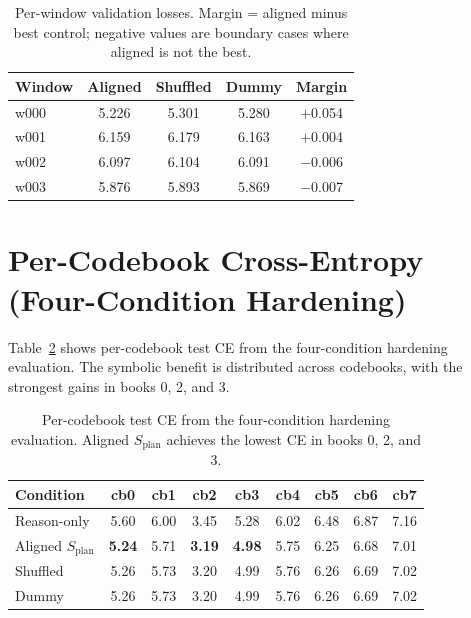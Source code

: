 \documentclass[11pt]{article}
\newcommand{\splan}{$S_{\mathrm{plan}}$}
\begin{document}
\begin{table}[h]
\centering
\small
\begin{tabular}{lcccc}
\toprule
Window & Aligned & Shuffled & Dummy & Margin \\
\midrule
w000 & 5.226 & 5.301 & 5.280 & $+$0.054 \\
w001 & 6.159 & 6.179 & 6.163 & $+$0.004 \\
w002 & 6.097 & 6.104 & 6.091 & $-$0.006 \\
w003 & 5.876 & 5.893 & 5.869 & $-$0.007 \\
\bottomrule
\end{tabular}
\caption{Per-window validation losses.  Margin = aligned minus best control;
  negative values are boundary cases where aligned is not the best.}
\label{tab:warmup_cases}
\end{table}

\section{Per-Codebook Cross-Entropy (Four-Condition Hardening)}
\label{app:codebook}

Table~\ref{tab:codebook} shows per-codebook test CE from the four-condition hardening
evaluation.  The symbolic benefit is distributed across codebooks, with the strongest
gains in books 0, 2, and 3.

\begin{table}[h]
\centering
\small
\setlength{\tabcolsep}{3pt}
\begin{tabular}{lcccccccc}
\toprule
Condition & cb0 & cb1 & cb2 & cb3 & cb4 & cb5 & cb6 & cb7 \\
\midrule
Reason-only & 5.60 & 6.00 & 3.45 & 5.28 & 6.02 & 6.48 & 6.87 & 7.16 \\
Aligned \splan{} & \textbf{5.24} & 5.71 & \textbf{3.19} & \textbf{4.98} & 5.75 & 6.25 & 6.68 & 7.01 \\
Shuffled & 5.26 & 5.73 & 3.20 & 4.99 & 5.76 & 6.26 & 6.69 & 7.02 \\
Dummy & 5.26 & 5.73 & 3.20 & 4.99 & 5.76 & 6.26 & 6.69 & 7.02 \\
\bottomrule
\end{tabular}
\caption{Per-codebook test CE from the four-condition hardening evaluation.
  Aligned \splan{} achieves the lowest CE in books 0, 2, and 3.}
\label{tab:codebook}
\end{table}
\end{document}
